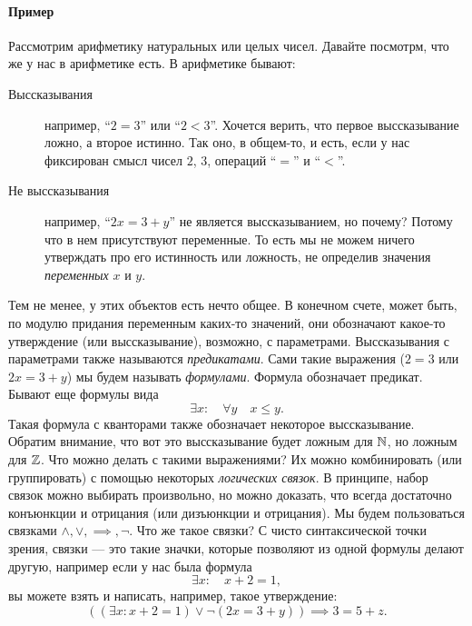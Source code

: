 \paragraph{Пример} Рассмотрим арифметику натуральных или целых чисел.
Давайте посмотрм, что же у нас в арифметике есть.
В арифметике бывают:
\begin{description}
    \item[Выссказывания] например, \enquote{$2 = 3$} или \enquote{$2 < 3$}.
    Хочется верить, что первое выссказывание ложно, а второе истинно.
    Так оно, в общем-то, и есть, если у нас фиксирован смысл чисел $2$, $3$, операций \enquote{$=$} и \enquote{$<$}.
    \item[Не выссказывания] например, \enquote{$2x = 3 + y$} не является выссказыванием, но почему?
    Потому что в нем присутствуют переменные.
    То есть мы не можем ничего утверждать про его истинность или ложность, не определив значения {\it переменных} $x$ и $y$.
\end{description}
Тем не менее, у этих объектов есть нечто общее.
В конечном счете, может быть, по модулю придания переменным каких-то значений, они обозначают какое-то утверждение (или выссказывание), возможно, с параметрами.
Выссказывания с параметрами также называются {\it предикатами}.
Сами такие выражения ($2 = 3$ или $2x = 3 + y$) мы будем называть {\it формулами}.
Формула обозначает предикат.
Бывают еще формулы вида
\begin{equation} \label{eq::06::01}
    \exists x: \quad \forall y \quad x \leqslant y.
\end{equation}
Такая формула с кванторами также обозначает некоторое выссказывание.
Обратим внимание, что вот это выссказывание будет ложным для $\mathbb{N}$, но ложным для $\mathbb{Z}$.
Что можно делать с такими выражениями?
Их можно комбинировать (или группировать) с помощью некоторых {\it логических связок}.
В принципе, набор связок можно выбирать произвольно, но можно доказать, что всегда достаточно конъюнкции и отрицания (или дизъюнкции и отрицания).
Мы будем пользоваться связками $\land, \lor, \implies, \neg$.
Что же такое связки?
С чисто синтаксической точки зрения, связки --- это такие значки, которые позволяют из одной формулы делают другую, например если у нас была формула
\begin{equation} \label{eq::06::02}
    \exists x: \quad x + 2 = 1,
\end{equation}
вы можете взять и написать, например, такое утверждение:
\begin{equation}
    \left(\left(\exists x: x + 2 = 1\right) \lor \neg \left(2x = 3 + y\right)\right) \implies 3 = 5 + z.
\end{equation}

